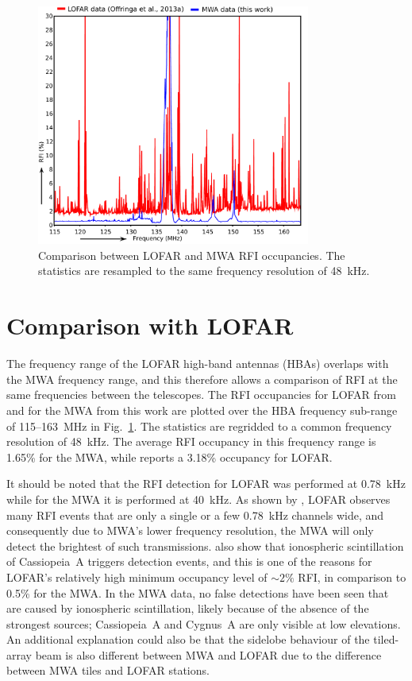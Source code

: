 \documentclass{pasa}
\begin{document}
\noindent\begin{figure}
\begin{center}\hspace*{-0.2cm}\includegraphics[width=9cm]{img/LOFAR-MWA-occupancy}
\caption{Comparison between LOFAR and MWA RFI occupancies. The statistics are resampled to the same frequency resolution of 48~kHz. }
\label{fig:lofar-mwa-occupancy}
\end{center}
\end{figure}

\section{Comparison with LOFAR} \label{ch:lofar-comparison}
The frequency range of the LOFAR high-band antennas (HBAs) overlaps with the MWA frequency range, and this therefore allows a comparison of RFI at the same frequencies between the telescopes. The RFI occupancies for LOFAR from \citet{lofar-radio-environment} and for the MWA from this work are plotted over the HBA frequency sub-range of 115--163~MHz in Fig.~\ref{fig:lofar-mwa-occupancy}. The statistics are regridded to a common frequency resolution of 48~kHz. The average RFI occupancy in this frequency range is 1.65\% for the MWA, while \citet{lofar-radio-environment} reports a 3.18\% occupancy for LOFAR.

It should be noted that the RFI detection for LOFAR was performed at 0.78~kHz while for the MWA it is performed at 40~kHz. As shown by \citet{lofar-radio-environment}, LOFAR observes many RFI events that are only a single or a few 0.78~kHz channels wide, and consequently due to MWA's lower frequency resolution, the MWA will only detect the brightest of such transmissions. \citet{lofar-radio-environment} also show that ionospheric scintillation of Cassiopeia~A triggers detection events, and this is one of the reasons for LOFAR's relatively high minimum occupancy level of $\sim2\%$ RFI, in comparison to 0.5\% for the MWA. In the MWA data, no false detections have been seen that are caused by ionospheric scintillation, likely because of the absence of the strongest sources; Cassiopeia~A and Cygnus~A are only visible at low elevations. An additional explanation could also be that the sidelobe behaviour of the tiled-array beam is also different between MWA and LOFAR due to the difference between MWA tiles and LOFAR stations.
\end{document}

